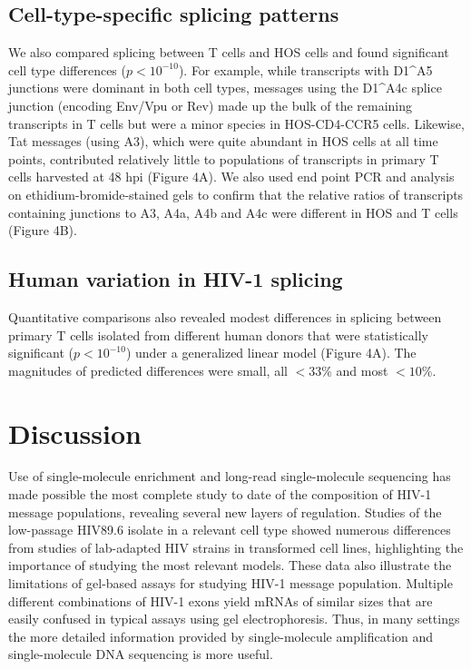 \documentclass[../sherrill-Mix_thesis.tex]{subfiles}
\begin{document}
\subsection{Cell-type-specific splicing patterns}
We also compared splicing between T cells and HOS cells and found significant cell type differences ($p < 10^{-10}$). For example, while transcripts with D1\^{}A5 junctions were dominant in both cell types, messages using the D1\^{}A4c splice junction (encoding Env/Vpu or Rev) made up the bulk of the remaining transcripts in T cells but were a minor species in HOS-CD4-CCR5 cells. Likewise, Tat messages (using A3), which were quite abundant in HOS cells at all time points, contributed relatively little to populations of transcripts in primary T cells harvested at 48 hpi (Figure 4A). We also used end point PCR and analysis on ethidium-bromide-stained gels to confirm that the relative ratios of transcripts containing junctions to A3, A4a, A4b and A4c were different in HOS and T cells (Figure 4B).

\subsection{Human variation in HIV-1 splicing}

Quantitative comparisons also revealed modest differences in splicing between primary \cdFour{} T cells isolated from different human donors that were statistically significant ($p < 10^{-10}$) under a generalized linear model (Figure 4A). The magnitudes of predicted differences were small, all $<33$\% and most $<10$\%.


\section{Discussion}
Use of single-molecule enrichment and long-read single-molecule sequencing has made possible the most complete study to date of the composition of HIV-1 message populations, revealing several new layers of regulation. Studies of the low-passage HIV89.6 isolate in a relevant cell type showed numerous differences from studies of lab-adapted HIV strains in transformed cell lines, highlighting the importance of studying the most relevant models. These data also illustrate the limitations of gel-based assays for studying HIV-1 message population. Multiple different combinations of HIV-1 exons yield mRNAs of similar sizes that are easily confused in typical assays using gel electrophoresis. Thus, in many settings the more detailed information provided by single-molecule amplification and single-molecule DNA sequencing is more useful.
\end{document}
